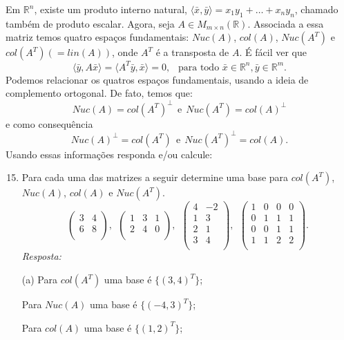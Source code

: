 \documentclass[10pt]{article}
\theoremstyle{plain}
\theoremstyle{obs}
\numberwithin{equation}{section}
\begin{document}
Em $\mathbb{R}^{n}$, existe um produto interno natural, 
$\langle \bar{x}, \bar{y} \rangle=x_1y_1+\dots+x_ny_n$, chamado também de produto escalar.
Agora, seja $A \in M_{m \times n}(\mathbb{R})$. Associada a essa matriz temos 
quatro espaços fundamentais: $Nuc(A)$, $col(A)$, $Nuc(A^{T})$ e $col(A^{T})(=lin(A))$, 
onde $A^{T}$ é a transposta de $A$. É fácil ver que 
$$ \langle \bar{y}, A \bar{x} \rangle= \langle A^{T}\bar{y}, \bar{x} \rangle=0, \ \ 
\text{ para todo } \bar{x} \in \mathbb{R}^{n}, \bar{y} \in \mathbb{R}^{m}.$$
Podemos relacionar os quatros espaços fundamentais, usando a ideia 
de complemento ortogonal. De fato, temos que: 
$$ Nuc(A)=col(A^{T})^{\perp} \ \ \text{e} \ \ Nuc(A^{T})=col(A)^{\perp}$$
e como consequência 
$$ Nuc(A)^{\perp}=col(A^{T}) \ \ \text{e} \ \ Nuc(A^{T})^{\perp}=col(A).$$
Usando essas informações responda e/ou calcule:
 \begin{enumerate}
 \setcounter{enumi}{14}
 \item Para cada uma das matrizes a seguir 
 determine uma base para 
 $col(A^{T})$, $Nuc(A)$, $col(A)$ e $Nuc(A^{T})$.
 $$
\begin{pmatrix}
3 & 4 \\
6 & 8 \\
\end{pmatrix}, \ \
\begin{pmatrix}
1 & 3 & 1 \\%
2 & 4 & 0 \\
\end{pmatrix}, \ \  
\begin{pmatrix}
4 & -2  \\
1 & 3 \\
2 & 1 \\
3 & 4 \\
\end{pmatrix}, \ \
\begin{pmatrix}
1 & 0 & 0 & 0 \\%
0 & 1 & 1 & 1 \\
0 & 0 & 1 & 1 \\
1 & 1 & 2 & 2 \\
\end{pmatrix}.  
 $$ 
 {\it Resposta:} 
 
 (a) 
 Para $col(A^{T})$ uma base é $\{(3,4)^{T}\}$;
 
 Para $Nuc(A)$ uma base é $\{(-4,3)^{T}\}$;
 
 Para $col(A)$ uma base é $\{(1,2)^{T}\}$;
     

\end{enumerate}
\end{document}
